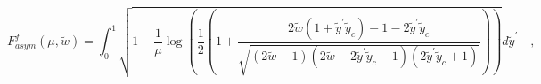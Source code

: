 \begin{equation}
F^f_{asym}(\mu,\tilde{w}) = \int^1_0
\sqrt{1-\frac{1}{\mu}\log\left(\frac{1}{2}\left(1+\frac{2\tilde{w}(1+\tilde{y}^\prime \tilde{y}_c)-1-2\tilde{y}^\prime \tilde{y}_c}{\sqrt{(2\tilde{w}-1)(2\tilde{w}-2\tilde{y}^\prime \tilde{y}_c-1)(2\tilde{y}^\prime \tilde{y}_c+1)}}\right)\right)} d\tilde{y}^\prime \quad,
\end{equation}

